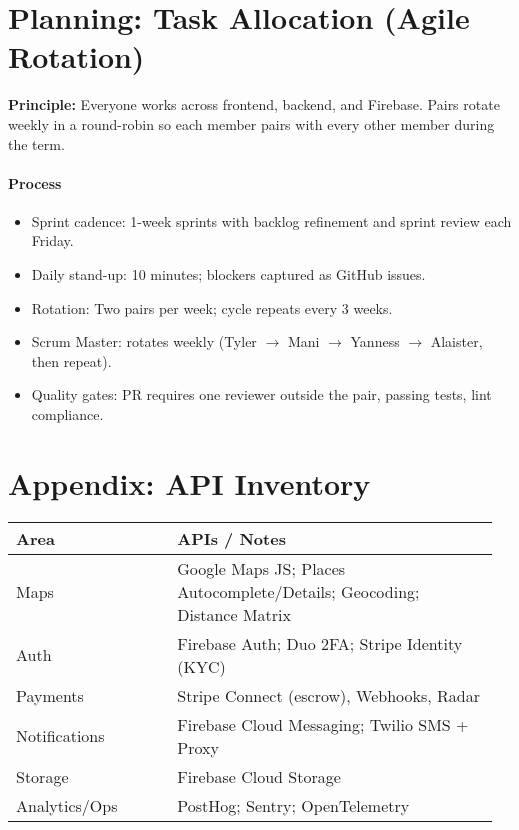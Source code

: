 \documentclass[11pt]{article}
\begin{document}
\section{Planning: Task Allocation (Agile Rotation)}
\textbf{Principle:} Everyone works across frontend, backend, and Firebase. Pairs rotate weekly in a round-robin so each member pairs with every other member during the term.

\paragraph{Process}
\begin{itemize}[leftmargin=1.4em]
  \item Sprint cadence: 1-week sprints with backlog refinement and sprint review each Friday.
  \item Daily stand-up: 10 minutes; blockers captured as GitHub issues.
  \item Rotation: Two pairs per week; cycle repeats every 3 weeks.
  \item Scrum Master: rotates weekly (Tyler $\rightarrow$ Mani $\rightarrow$ Yanness $\rightarrow$ Alaister, then repeat).
  \item Quality gates: PR requires one reviewer outside the pair, passing tests, lint compliance.
\end{itemize}

\newpage

\section*{Appendix: API Inventory}
\begin{longtable}{@{}p{0.32\linewidth} p{0.64\linewidth}@{}}
\toprule
\textbf{Area} & \textbf{APIs / Notes} \\
\midrule
Maps & Google Maps JS; Places Autocomplete/Details; Geocoding; Distance Matrix \\
Auth & Firebase Auth; Duo 2FA; Stripe Identity (KYC) \\
Payments & Stripe Connect (escrow), Webhooks, Radar \\
Notifications & Firebase Cloud Messaging; Twilio SMS + Proxy \\
Storage & Firebase Cloud Storage \\
Analytics/Ops & PostHog; Sentry; OpenTelemetry \\
\bottomrule
\end{longtable}
\end{document}
